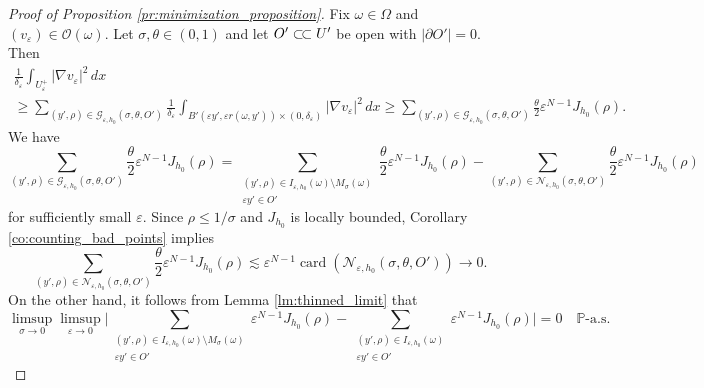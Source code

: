\documentclass{article}
\numberwithin{equation}{section}
\theoremstyle{definition}
\theoremstyle{remark}
\newcommand{\card}{\operatorname{card}}
\newcommand{\csubset}{\subset\joinrel\subset}
\begin{document}
\begin{proof}[Proof of Proposition \ref{pr:minimization_proposition}]
    Fix $\omega \in \Omega$ and $(v_\varepsilon) \in \mathcal{O}(\omega)$. Let $\sigma, \theta \in (0, 1)$ and let $O' \csubset U'$ be open with $|\partial O'| = 0$. Then
    \begin{multline} \label{eq:good_points_lower_bound}
        \frac{1}{\delta_\varepsilon} \int_{U_\varepsilon^+} |\nabla v_\varepsilon|^2 \, dx \\
        \ge \sum_{(y', \rho) \in \mathcal{G}_{\varepsilon, h_0}(\sigma, \theta, O')} \frac{1}{\delta_\varepsilon} \int_{B'(\varepsilon y', \varepsilon r(\omega, y')) \times (0, \delta_\varepsilon)} |\nabla v_\varepsilon|^2 \, dx \ge \sum_{(y', \rho) \in \mathcal{G}_{\varepsilon, h_0}(\sigma, \theta, O')} \frac{\theta}{2} \varepsilon^{N - 1} J_{h_0}(\rho).
    \end{multline}
    We have
    \begin{equation} \label{eq:add_and_subtract_bad_points}
        \sum_{(y', \rho) \in \mathcal{G}_{\varepsilon, h_0}(\sigma, \theta, O')} \frac{\theta}{2} \varepsilon^{N - 1} J_{h_0}(\rho) = \sum \limits_{\substack{(y', \rho) \in I_{\varepsilon, h_0}(\omega) \setminus M_\sigma(\omega) \\ \varepsilon y' \in O'}} \frac{\theta}{2} \varepsilon^{N - 1} J_{h_0}(\rho) - \sum_{(y', \rho) \in \mathcal{N}_{\varepsilon, h_0}(\sigma, \theta, O')} \frac{\theta}{2} \varepsilon^{N - 1} J_{h_0}(\rho)
    \end{equation}
    for sufficiently small $\varepsilon$. Since $\rho \le 1/\sigma$ and $J_{h_0}$ is locally bounded, Corollary \ref{co:counting_bad_points} implies
    \begin{equation} \label{eq:bad_points_estimate}
        \sum_{(y', \rho) \in \mathcal{N}_{\varepsilon, h_0}(\sigma, \theta, O')} \frac{\theta}{2} \varepsilon^{N - 1} J_{h_0}(\rho) \lesssim \varepsilon^{N - 1} \card\left(\mathcal{N}_{\varepsilon, h_0}(\sigma, \theta, O')\right) \to 0.
    \end{equation}
    On the other hand, it follows from Lemma \ref{lm:thinned_limit} that
    \begin{equation} \label{eq:two_sums_are_close}
        \limsup_{\sigma \to 0} \limsup_{\varepsilon \to 0} \Bigg|\sum \limits_{\substack{(y', \rho) \in I_{\varepsilon, h_0}(\omega) \setminus M_\sigma(\omega) \\ \varepsilon y' \in O'}} \varepsilon^{N - 1} J_{h_0}(\rho) - \sum \limits_{\substack{(y', \rho) \in I_{\varepsilon, h_0}(\omega) \\ \varepsilon y' \in O'}} \varepsilon^{N - 1} J_{h_0}(\rho)\Bigg| = 0 \quad \mathbb{P}\text{-a.s.}

\end{equation}
\end{proof}
\end{document}
